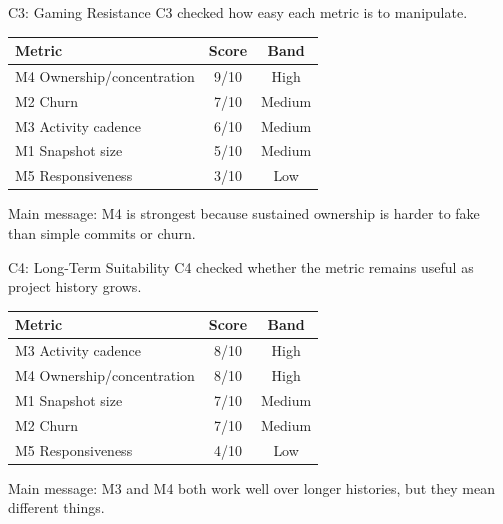 \documentclass[aspectratio=169,11pt]{beamer}
\begin{document}
\begin{frame}{C3: Gaming Resistance}
  C3 checked how easy each metric is to manipulate.

  \begin{table}
    \footnotesize
    \begin{tabular}{lcc}
      \toprule
      Metric & Score & Band \\
      \midrule
      M4 Ownership/concentration & 9/10 & High \\
      M2 Churn & 7/10 & Medium \\
      M3 Activity cadence & 6/10 & Medium \\
      M1 Snapshot size & 5/10 & Medium \\
      M5 Responsiveness & 3/10 & Low \\
      \bottomrule
    \end{tabular}
  \end{table}

  \vspace{0.2cm}
  Main message: M4 is strongest because sustained ownership is harder to fake than simple commits or churn.
\end{frame}

\begin{frame}{C4: Long-Term Suitability}
  C4 checked whether the metric remains useful as project history grows.

  \begin{table}
    \footnotesize
    \begin{tabular}{lcc}
      \toprule
      Metric & Score & Band \\
      \midrule
      M3 Activity cadence & 8/10 & High \\
      M4 Ownership/concentration & 8/10 & High \\
      M1 Snapshot size & 7/10 & Medium \\
      M2 Churn & 7/10 & Medium \\
      M5 Responsiveness & 4/10 & Low \\
      \bottomrule
    \end{tabular}
  \end{table}

  \vspace{0.2cm}
  Main message: M3 and M4 both work well over longer histories, but they mean different things.
\end{frame}
\end{document}
